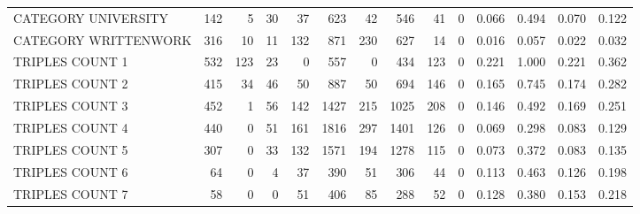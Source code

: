 \begin{tabular}{lrrrrrrrrrllll}
 CATEGORY UNIVERSITY      &             142 &             5 &              30 &              37 &             623 &   42 &  546 &   41 &    0 & 0.066 & 0.494 & 0.070 & 0.122 \\
 CATEGORY WRITTENWORK     &             316 &            10 &              11 &             132 &             871 &  230 &  627 &   14 &    0 & 0.016 & 0.057 & 0.022 & 0.032 \\
 TRIPLES COUNT 1          &             532 &           123 &              23 &               0 &             557 &    0 &  434 &  123 &    0 & 0.221 & 1.000 & 0.221 & 0.362 \\
 TRIPLES COUNT 2          &             415 &            34 &              46 &              50 &             887 &   50 &  694 &  146 &    0 & 0.165 & 0.745 & 0.174 & 0.282 \\
 TRIPLES COUNT 3          &             452 &             1 &              56 &             142 &            1427 &  215 & 1025 &  208 &    0 & 0.146 & 0.492 & 0.169 & 0.251 \\
 TRIPLES COUNT 4          &             440 &             0 &              51 &             161 &            1816 &  297 & 1401 &  126 &    0 & 0.069 & 0.298 & 0.083 & 0.129 \\
 TRIPLES COUNT 5          &             307 &             0 &              33 &             132 &            1571 &  194 & 1278 &  115 &    0 & 0.073 & 0.372 & 0.083 & 0.135 \\
 TRIPLES COUNT 6          &              64 &             0 &               4 &              37 &             390 &   51 &  306 &   44 &    0 & 0.113 & 0.463 & 0.126 & 0.198 \\
 TRIPLES COUNT 7          &              58 &             0 &               0 &              51 &             406 &   85 &  288 &   52 &    0 & 0.128 & 0.380 & 0.153 & 0.218 \\
\hline
\end{tabular}